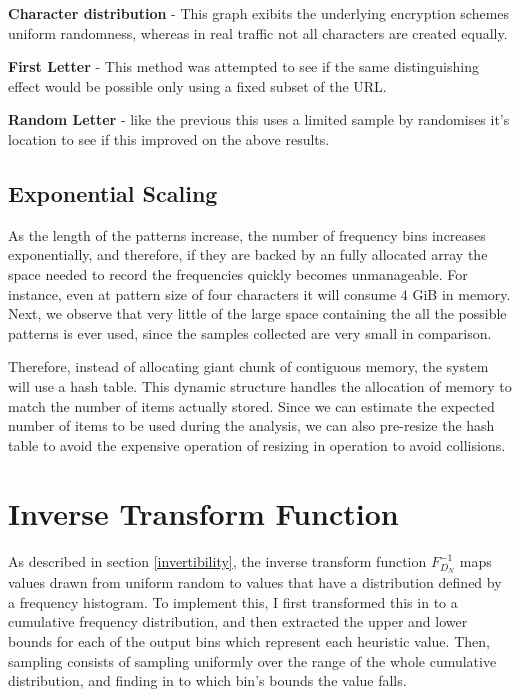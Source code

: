 \documentclass[ %
                    author={Samuel Russell},
                supervisor={Prof. Bogdan Warinschi},
                    degree={MEng},
                     title={Innocuous Ciphertexts},
                  subtitle={The DE-CENSOR Scheme},
                      type={research},
                      year={2018} ]{dissertation}
\begin{document}
\textbf{Character distribution} - This graph exibits the underlying encryption schemes uniform randomness, whereas in real traffic not all characters are created equally.

\textbf{First Letter} - This method was attempted to see if the same distinguishing effect would be possible only using a fixed subset of the URL.

\textbf{Random Letter} - like the previous this uses a limited sample by randomises it's location to see if this improved on the above results.

\subsection{Exponential Scaling}

As the length of the patterns increase, the number of frequency bins increases exponentially, and therefore, if they are backed by an fully allocated array the space needed to record the frequencies quickly becomes unmanageable.
For instance, even at pattern size of four characters it will consume 4 GiB in memory.
Next, we observe that very little of the large space containing the all the possible patterns is ever used, since the samples collected are very small in comparison.

Therefore, instead of allocating giant chunk of contiguous memory, the system will use a hash table.
This dynamic structure handles the allocation of memory to match the number of items actually stored.
Since we can estimate the expected number of items to be used during the analysis, we can also pre-resize the hash table to avoid the expensive operation of resizing in operation to avoid collisions.

\section{Inverse Transform Function}

As described in section \ref{invertibility}, the inverse transform function $F^{-1}_{D_N}$ maps values drawn from uniform random to values that have a distribution defined by a frequency histogram.
To implement this, I first transformed this in to a cumulative frequency distribution, and then extracted the upper and lower bounds for each of the output bins which represent each heuristic value.
Then, sampling consists of sampling uniformly over the range of the whole cumulative distribution, and finding in to which bin's bounds the value falls.
\end{document}
